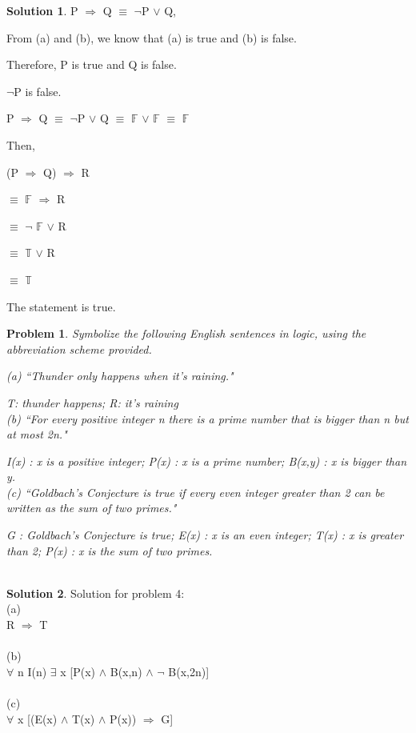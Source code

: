 \documentclass{article}
\newtheorem{problem}{Problem}
\theoremstyle{definition}
\newtheorem*{solution}{Solution}
\begin{document}
\begin{solution}
 P \(\Rightarrow\) Q \(\equiv\) \(\neg\)P \(\vee\) Q,
 
 From (a) and (b), we know that (a) is true and (b) is false. 
 
 Therefore, P is true and Q is false.
 
 \(\neg\)P is false.
 
 P \(\Rightarrow\) Q \(\equiv\) \(\neg\)P \(\vee\) Q \(\equiv\) \(\mathbb{F}\) \(\vee\) \(\mathbb{F}\) \(\equiv\) \(\mathbb{F}\) 
 
 Then,
 
 (P \(\Rightarrow\) Q) \(\Rightarrow\) R
 
 \(\equiv\) \(\mathbb{F}\) \(\Rightarrow\) R
 
 \(\equiv\) \(\neg\) \(\mathbb{F}\) \(\vee\) R
 
 \(\equiv\) \(\mathbb{T}\) \(\vee\) R
 
 \(\equiv\) \(\mathbb{T}\)
 
 The statement is true.
 
\end{solution}

\break

\begin{problem}
Symbolize the following English sentences in logic, using the abbreviation scheme provided.

(a) ``Thunder only happens when it's raining."

T: thunder happens; R: it's raining\\

(b) ``For every positive integer n there is a prime number that is bigger than n but at most 2n."

I(x) : x is a positive integer; P(x) : x is a prime number; B(x,y) : x is bigger than y.\\

(c) ``Goldbach's Conjecture is true if every even integer greater than 2 can be written as the sum of two primes."

G : Goldbach's Conjecture is true; E(x) : x is an even integer; T(x) : x is greater than 2; P(x) : x is the sum of two primes.\\\\
\end{problem}

\begin{solution}
Solution for problem 4:\\

(a)\\

R \(\Rightarrow\) T\\\\

(b)\\

\(\forall\) n I(n) \(\exists\) x [P(x) \(\wedge\) B(x,n) \(\wedge\) \(\neg\) B(x,2n)]\\\\

(c)\\

\(\forall\) x [(E(x) \(\wedge\) T(x) \(\wedge\) P(x)) \(\Rightarrow\) G]




\end{solution}
\end{document}

